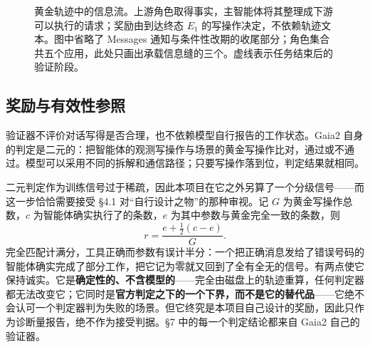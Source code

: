 \documentclass[UTF8,11pt,fontset=fandol]{ctexart}
\begin{document}
\begin{figure}[H]
\caption{黄金轨迹中的信息流。上游角色取得事实，主智能体将其整理成下游可以执行的请求；奖励由到达终态 $E_1$ 的写操作决定，不依赖轨迹文本。图中省略了 Messages 通知与条件性改期的收尾部分；角色集合共五个应用，此处只画出承载信息缝的三个。虚线表示任务结束后的验证阶段。}
\label{fig:trajectory}
\end{figure}

\subsection{奖励与有效性参照}

验证器不评价对话写得是否合理，也不依赖模型自行报告的工作状态。Gaia2 自身的判定是二元的：把智能体的观测写操作与场景的黄金写操作比对，通过或不通过。模型可以采用不同的拆解和通信路径；只要写操作落到位，判定结果就相同。

二元判定作为训练信号过于稀疏，因此本项目在它之外另算了一个分级信号——而这一步恰恰需要接受 \S4.1 对“自行设计之物”的那种审视。记 $G$ 为黄金写操作总数，$c$ 为智能体确实执行了的条数，$e$ 为其中参数与黄金完全一致的条数，则
\[
  r=\frac{e+\tfrac{1}{2}(c-e)}{G}.
\]
完全匹配计满分，工具正确而参数有误计半分：一个把正确消息发给了错误号码的智能体确实完成了部分工作，把它记为零就又回到了全有全无的信号。有两点使它保持诚实。它是\textbf{确定性的、不含模型的}——完全由磁盘上的轨迹重算，任何判定器都无法改变它；它同时是\textbf{官方判定之下的一个下界，而不是它的替代品}——它绝不会认可一个判定器判为失败的场景。但它终究是本项目自己设计的奖励，因此只作为诊断量报告，绝不作为接受判据。\S7 中的每一个判定结论都来自 Gaia2 自己的验证器。
\end{document}
